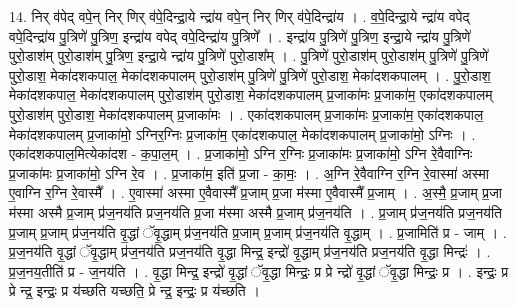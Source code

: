\documentclass[17pt]{extarticle}
\begin{document}
14. निर् व॑पेद् वपे॒न् निर् णिर् व॑पे॒दिन्द्रा॒ये न्द्रा॑य वपे॒न् निर् णिर् व॑पे॒दिन्द्रा॑य । . व॒पे॒दिन्द्रा॒ये न्द्रा॑य वपेद् वपे॒दिन्द्रा॑य पु॒त्रिणे॑ पु॒त्रिण॒ इन्द्रा॑य वपेद् वपे॒दिन्द्रा॑य पु॒त्रिणे᳚ । . इन्द्रा॑य पु॒त्रिणे॑ पु॒त्रिण॒ इन्द्रा॒ये न्द्रा॑य पु॒त्रिणे॑ पुरो॒डाश॑म् पुरो॒डाश॑म् पु॒त्रिण॒ इन्द्रा॒ये न्द्रा॑य पु॒त्रिणे॑ पुरो॒डाश᳚म् । . पु॒त्रिणे॑ पुरो॒डाश॑म् पुरो॒डाश॑म् पु॒त्रिणे॑ पु॒त्रिणे॑ पुरो॒डाश॒ मेका॑दशकपाल॒ मेका॑दशकपालम् पुरो॒डाश॑म् पु॒त्रिणे॑ पु॒त्रिणे॑ पुरो॒डाश॒ मेका॑दशकपालम् । . पु॒रो॒डाश॒ मेका॑दशकपाल॒ मेका॑दशकपालम् पुरो॒डाश॑म् पुरो॒डाश॒ मेका॑दशकपालम् प्र॒जाका॑मः प्र॒जाका॑म॒ एका॑दशकपालम् पुरो॒डाश॑म् पुरो॒डाश॒ मेका॑दशकपालम् प्र॒जाका॑मः । . एका॑दशकपालम् प्र॒जाका॑मः प्र॒जाका॑म॒ एका॑दशकपाल॒ मेका॑दशकपालम् प्र॒जाका॑मो॒ ऽग्निर॒ग्निः प्र॒जाका॑म॒ एका॑दशकपाल॒ मेका॑दशकपालम् प्र॒जाका॑मो॒ ऽग्निः । . एका॑दशकपाल॒मित्येका॑दश - क॒पा॒ल॒म् । . प्र॒जाका॑मो॒ ऽग्नि र॒ग्निः प्र॒जाका॑मः प्र॒जाका॑मो॒ ऽग्नि रे॒वैवाग्निः प्र॒जाका॑मः प्र॒जाका॑मो॒ ऽग्नि रे॒व । . प्र॒जाका॑म॒ इति॑ प्र॒जा - का॒मः॒ । . अ॒ग्नि रे॒वैवाग्नि र॒ग्नि रे॒वास्मा॑ अस्मा ए॒वाग्नि र॒ग्नि रे॒वास्मै᳚ । . ए॒वास्मा॑ अस्मा ए॒वैवास्मै᳚ प्र॒जाम् प्र॒जा म॑स्मा ए॒वैवास्मै᳚ प्र॒जाम् । . अ॒स्मै॒ प्र॒जाम् प्र॒जा म॑स्मा अस्मै प्र॒जाम् प्र॑ज॒नय॑ति प्रज॒नय॑ति प्र॒जा म॑स्मा अस्मै प्र॒जाम् प्र॑ज॒नय॑ति । . प्र॒जाम् प्र॑ज॒नय॑ति प्रज॒नय॑ति प्र॒जाम् प्र॒जाम् प्र॑ज॒नय॑ति वृ॒द्धां ॅवृ॒द्धाम् प्र॑ज॒नय॑ति प्र॒जाम् प्र॒जाम् प्र॑ज॒नय॑ति वृ॒द्धाम् । . प्र॒जामिति॑ प्र - जाम् । . प्र॒ज॒नय॑ति वृ॒द्धां ॅवृ॒द्धाम् प्र॑ज॒नय॑ति प्रज॒नय॑ति वृ॒द्धा मिन्द्र॒ इन्द्रो॑ वृ॒द्धाम् प्र॑ज॒नय॑ति प्रज॒नय॑ति वृ॒द्धा मिन्द्रः॑ । . प्र॒ज॒नय॒तीति॑ प्र - ज॒नय॑ति । . वृ॒द्धा मिन्द्र॒ इन्द्रो॑ वृ॒द्धां ॅवृ॒द्धा मिन्द्रः॒ प्र प्रे न्द्रो॑ वृ॒द्धां ॅवृ॒द्धा मिन्द्रः॒ प्र । . इन्द्रः॒ प्र प्रे न्द्र॒ इन्द्रः॒ प्र य॑च्छति यच्छति॒ प्रे न्द्र॒ इन्द्रः॒ प्र य॑च्छति । \newline
\end{document}
